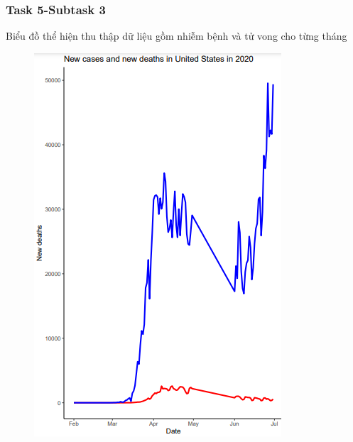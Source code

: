 \documentclass[english,10pt,table]{beamer}
\begin{document}
{
    \frametitle{Task 5-Subtask 3}
    \begin{block}{Biểu đồ thể hiện thu thập dữ liệu gồm nhiễm bệnh và tử vong cho từng tháng}
    \begin{figure}[H]
		\centering
		\includegraphics[scale=0.5]{images/5.3.3.png}
	\end{figure}
    \end{block}
}
\frame
\end{document}
